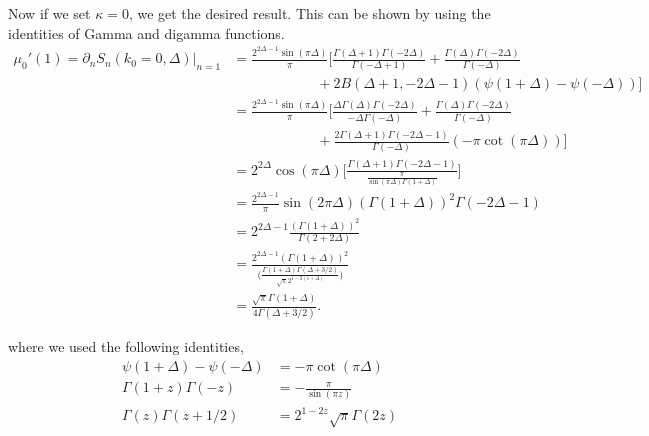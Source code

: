 \documentclass[11pt]{article}
\newcommand{\p}{\partial}
\newcommand{\nn}{\nonumber}
\newcommand{\JM}[1]{\textcolor{orange}{#1}}
\begin{document}
Now if we set $\kappa = 0$, we get the desired result. This can be shown by using the identities of Gamma and digamma functions.
\begin{align}
    \mu_0'(1) =  \p_nS_n(k_0 = 0,\Delta)\big|_{n=1}& = \frac{2^{2\Delta -1}\sin (\pi \Delta)}{\pi} \Big[ \frac{\Gamma(\Delta +1) \Gamma(-2\Delta)}{\Gamma(-\Delta +1)} + \frac{\Gamma(\Delta) \Gamma(-2\Delta)}{\Gamma(-\Delta)} \nn \\
    &\qquad \qquad \qquad+ 2B(\Delta + 1, -2\Delta -1) (\psi(1+ \Delta) - \psi(-\Delta))\Big]  
    \nn \\
    & = \frac{2^{2\Delta -1}\sin (\pi \Delta)}{\pi}  \Big[ \frac{\Delta \Gamma(\Delta)\Gamma(-2\Delta)}{-\Delta \Gamma(-\Delta) } + \frac{\Gamma(\Delta)\Gamma(-2\Delta)}{\Gamma(-\Delta)}\nn \\
    &\qquad \qquad \qquad+ \frac{2\Gamma(\Delta + 1)\Gamma(-2\Delta - 1)}{\Gamma(-\Delta)}(-\pi \cot (\pi \Delta))
    \Big]\nn \\
    &= 2^{2\Delta}\cos (\pi \Delta) \Big[  \frac{\Gamma(\Delta + 1)\Gamma(-2\Delta -1)}{\frac{\pi }{\sin(\pi \Delta)\Gamma(1+\Delta)}}\Big]\nn \\
    &=  \frac{2^{2\Delta - 1}} {\pi}\sin(2\pi \Delta) (\Gamma(1+\Delta))^2 \Gamma(-2\Delta - 1) \nn \\
    &= 2^{2\Delta - 1}  \frac{(\Gamma(1+\Delta))^2}{\Gamma(2+2\Delta)} \nn \\
    &= \frac{2^{2\Delta -1}(\Gamma(1+\Delta))^2}{\Big(\frac{\Gamma(1+\Delta)\Gamma(\Delta + 3/2)}{\sqrt{\pi} 2^{1-2(1+\Delta)}}\Big)} \nn \\
    &= \frac{\sqrt{\pi }\Gamma(1+\Delta)}{4 \Gamma(\Delta + 3/2)}.
\end{align}

where we used the following identities,
\begin{align*}
    \psi(1+\Delta) - \psi(-\Delta) &= -\pi \cot(\pi \Delta)\nn \\
    \Gamma(1+z)\Gamma(-z) &= -\frac{\pi}{\sin(\pi z)} \nn \\ 
    \Gamma(z)\Gamma(z+1/2)& = 2^{1-2z}\sqrt{\pi}\Gamma(2z)
\end{align*}

\end{document}

